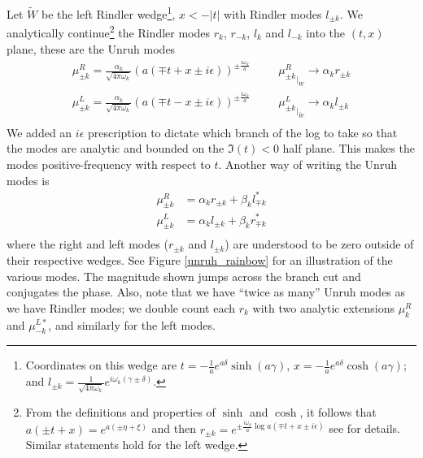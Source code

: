\documentclass[12pt,a4paper]{article}
\begin{document}
Let $\widetilde{W}$ be the left Rindler wedge\footnote{Coordinates on this wedge are $t = -\frac{1}{a}e^{a\delta} \sinh(a\gamma)$, $x = -\frac{1}{a}e^{a\delta} \cosh(a\gamma)$; and $l_{\pm k} = \frac{1}{\sqrt{4 \pi \omega_k}} e^{i\omega_k(\gamma \pm \delta)}$.}, $x < -|t|$ with Rindler modes $l_{\pm k}$.  We analytically continue\footnote{From the definitions and properties of $\sinh$ and $\cosh$, it follows that $a(\pm t + x) = e^{a(\pm \eta + \xi)}$ and then $r_{\pm k} = e^{\pm \frac{i \omega_k}{a}\log a(\mp t + x \pm i\epsilon)}$ see \cite{frodden2018unruh} for details.  Similar statements hold for the left wedge.} the Rindler modes $r_k$, $r_{-k}$, $l_k$ and $l_{-k}$ into the $(t,x)$ plane, these are the Unruh modes
\begin{equation}
  \begin{array}{ll}
    \mu^R_{\pm k} = \frac{\alpha_k }{\sqrt{4 \pi \omega_k}} (a(\mp t + x \pm  i \epsilon))^{\pm \frac{i \omega_k}{a}} & \hspace{20pt}
       {\mu^R_{\pm k}}_{|_W} \rightarrow \alpha_k r_{\pm k} \\
    \mu^L_{\pm k} =  \frac{\alpha_k}{\sqrt{4 \pi \omega_k}} (a(\mp t - x \pm  i \epsilon))^{\pm \frac{i \omega_k}{a}} & \hspace{20pt}
    {\mu^L_{\pm k}}_{|_{\widetilde{W}}} \rightarrow \alpha_k l_{\pm k} \\
  \end{array}
  \label{rindler_mode_def}
\end{equation}
We added an $i \epsilon$ prescription to dictate which branch of the log to take so that the modes are analytic and bounded on the $\mathfrak{I}(t) < 0$ half plane.  This makes the modes positive-frequency with respect to $t$.  Another way of writing the Unruh modes is
\begin{equation}
\begin{aligned}
  \mu^R_{\pm k} &= \alpha_k r_{\pm k} + \beta_k l^*_{\mp k} \\
  \mu^L_{\pm k} &= \alpha_k l_{\pm k} + \beta_k r^*_{\mp k} \\
\end{aligned}
\label{unruh_mode_def}
\end{equation}
where the right and left modes ($r_{\pm k}$ and $l_{\pm k}$) are understood to be zero outside of their respective wedges. See Figure \ref{unruh_rainbow} for an illustration of the various modes. The magnitude shown jumps across the branch cut and conjugates the phase.  Also, note that we have ``twice as many'' Unruh modes as we have Rindler modes; we double count each $r_k$ with two analytic extensions $\mu^R_k$ and $\mu^{L*}_{-k}$, and similarly for the left modes.
\end{document}
